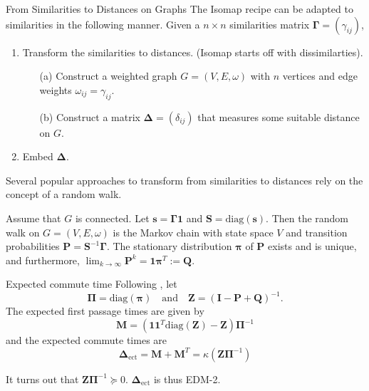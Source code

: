 \documentclass[professionalfonts,hyperref={pdfpagelabels=false,colorlinks=true,linkcolor=red}]{beamer}
\begin{document}
\begin{frame}{From Similarities to Distances on Graphs}
  The Isomap recipe can be adapted to similarities in the following manner.
  \vskip10pt Given a $n \times n$ similarities matrix $\bm{\Gamma} =
  (\gamma_{ij})$, 
  \begin{enumerate}
  \item Transform the similarities to distances. (Isomap
    starts off with dissimilarties).
    \begin{enumerate}
    \item[(a)]Construct a weighted graph $G = (V,E,\omega)$ with $n$
      vertices and edge weights $\omega_{ij} = \gamma_{ij}$.
    \item[(b)] Construct a matrix $\bm{\Delta} = (\delta_{ij})$
      that measures some suitable distance on $G$. 
    \end{enumerate}
  \item Embed $\bm{\Delta}$. 
  \end{enumerate}
  Several popular approaches to transform from similarities to
    distances rely on the concept of a \alert{random walk}.
    
    \vskip10pt Assume that $G$ is connected. Let $\bm{s} =
    \bm{\Gamma}\bm{1}$ and $\mathbf{S} = \mathrm{diag}(\bm{s})$. Then
    the random walk on $G = (V,E,\omega)$ is the Markov chain with
    state space $V$ and transition probabilities $\mathbf{P} =
    \mathbf{S}^{-1}\bm{\Gamma}$. The stationary distribution
    $\bm{\pi}$ of $\mathbf{P}$ exists and is unique, and furthermore,
    $\lim_{k \rightarrow \infty} \mathbf{P}^{k} = \bm{1}\bm{\pi}^{T}
    := \mathbf{Q}$.
\end{frame}

\begin{frame}{Expected commute time}
  Following \cite{kemeny83:_finit_markov_chain}, let
  \begin{equation*}
    \bm{\Pi} = \mathrm{diag}(\bm{\pi}) \quad \text{and} \quad
    \mathbf{Z} = (\mathbf{I} - \mathbf{P} + \mathbf{Q})^{-1}.
  \end{equation*}
  The expected first passage times are given by
  \begin{equation*}
    \mathbf{M} = (\mathbf{1}\mathbf{1}^{T}\mathrm{diag}(\mathbf{Z}) -
    \mathbf{Z})\bm{\Pi}^{-1} 
  \end{equation*}
  and the expected commute times are
  \begin{equation*}
    \bm{\Delta}_{\mathrm{ect}} = \mathbf{M} + \mathbf{M}^{T} =
    \kappa(\mathbf{Z}\bm{\Pi}^{-1})
  \end{equation*}

  It turns out that $\mathbf{Z}\bm{\Pi}^{-1} \succeq 0$. $\bm{\Delta}_{\mathrm{ect}}$ is thus \alert{EDM-2}.
\end{frame}
\end{document}

